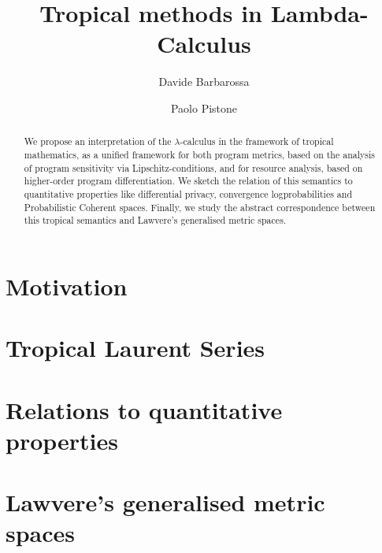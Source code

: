 \documentclass[submission,%
]{eptcs}
\title{Tropical methods in Lambda-Calculus}
\author{Davide Barbarossa
\institute{DISI, Universit\`a di Bologna}
\email{davide.barbarossa@unibo.it}
\and
\qquad\qquad Paolo Pistone
\institute{\qquad\qquad\qquad DISI, Universit\`a di Bologna}
\email{\qquad\qquad\qquad paolo.pistone@unibo.it}
}
\begin{document}
\maketitle

\begin{abstract}
We propose an interpretation of the $\lambda$-calculus in the framework of tropical mathematics, as a unified framework for both program metrics, based on the analysis of program sensitivity via Lipschitz-conditions, and for resource analysis, based on higher-order program differentiation.
We sketch the relation of this semantics to quantitative properties like differential privacy, convergence logprobabilities and Probabilistic Coherent spaces.
Finally, we study the abstract correspondence between this tropical semantics and Lawvere’s generalised metric spaces.
\end{abstract}

\section*{Motivation}



\section{Tropical Laurent Series}



\section{Relations to quantitative properties}



\section{Lawvere's generalised metric spaces}
\end{document}
